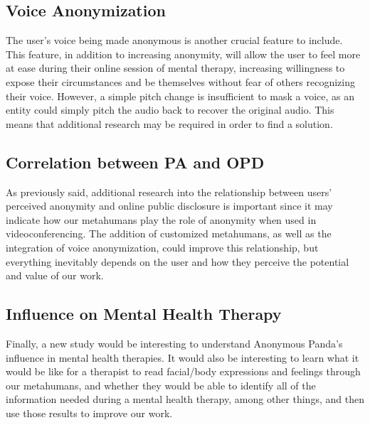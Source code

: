 \subsection{Voice Anonymization}
The user's voice being made anonymous is another crucial feature to include. This feature, in addition to increasing anonymity, will allow the user to feel more at ease during their online session of mental therapy, increasing willingness to expose their circumstances and be themselves without fear of others recognizing their voice. However, a simple pitch change is insufficient to mask a voice, as an entity could simply pitch the audio back to recover the original audio. This means that additional research may be required in order to find a solution.

\subsection{Correlation between PA and OPD}
As previously said, additional research into the relationship between users' perceived anonymity and online public disclosure is important since it may indicate how our metahumans play the role of anonymity when used in videoconferencing. The addition of customized metahumans, as well as the integration of voice anonymization, could improve this relationship, but everything inevitably depends on the user and how they perceive the potential and value of our work.


\subsection{Influence on Mental Health Therapy}
Finally, a new study would be interesting to understand Anonymous Panda's influence in mental health therapies. It would also be interesting to learn what it would be like for a therapist to read facial/body expressions and feelings through our metahumans, and whether they would be able to identify all of the information needed during a mental health therapy, among other things, and then use those results to improve our work.